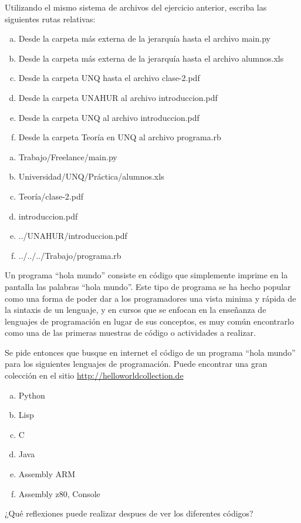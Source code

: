 \vspace{1cm}

\begin{exercise}
Utilizando el mismo sistema de archivos del ejercicio anterior, escriba
las siguientes rutas relativas:
\begin{enumerate}[a)]
    \item Desde la carpeta más externa de la jerarquía hasta el archivo
        main.py
    \item Desde la carpeta más externa de la jerarquía hasta el archivo
        alumnos.xls
    \item Desde la carpeta UNQ hasta el archivo clase-2.pdf
    \item Desde la carpeta UNAHUR al archivo introduccion.pdf
    \item Desde la carpeta UNQ al archivo introduccion.pdf
    \item Desde la carpeta Teoría en UNQ al archivo programa.rb
\end{enumerate}
\end{exercise}

\begin{enumerate}[a)]
    \item Trabajo/Freelance/main.py
    \item Universidad/UNQ/Práctica/alumnos.xls
    \item Teoría/clase-2.pdf
    \item introduccion.pdf
    \item ../UNAHUR/introduccion.pdf
    \item ../../../Trabajo/programa.rb
\end{enumerate}

\vspace{1cm}

\begin{exercise}
Un programa ``hola mundo'' consiste en código que simplemente imprime en la
pantalla las palabras ``hola mundo''. Este tipo de programa se ha hecho popular
como una forma de poder dar a los programadores una vista minima y rápida de
la sintaxis de un lenguaje, y en cursos que se enfocan en la enseñanza de lenguajes
de programación en lugar de sus conceptos, es muy común encontrarlo como una de
las primeras muestras de código o actividades a realizar.

Se pide entonces que busque en internet el código de un programa ``hola mundo''
para los siguientes lenguajes de programación. Puede encontrar una gran colección
en el sitio \href{http://helloworldcollection.de}{http://helloworldcollection.de}

\begin{enumerate}[a)]
    \item Python
    \item Lisp
    \item C
    \item Java
    \item Assembly ARM
    \item Assembly z80, Console
\end{enumerate}

¿Qué reflexiones puede realizar despues de ver los diferentes códigos?
\end{exercise}


